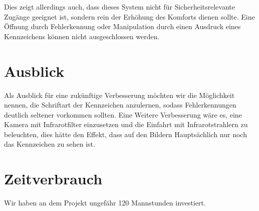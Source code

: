 \documentclass{../Vorlage/sebDenCls}
\begin{document}
Dies zeigt allerdings auch, dass dieses System nicht für Sicherheitsrelevante Zugänge geeignet ist, sondern rein der Erhöhung des Komforts dienen sollte. Eine Öffnung durch Fehlerkennung oder Manipulation durch einen Ausdruck eines Kennzeichens können nicht ausgeschlossen werden.
\section{Ausblick}
Als Ausblick für eine zukünftige Verbesserung möchten wir die Möglichkeit nennen, die Schriftart der Kennzeichen anzulernen, sodass Fehlerkennungen deutlich seltener vorkommen sollten.
Eine Weitere Verbesserung wäre es, eine Kamera mit Infrarotfilter einzusetzen und die Einfahrt mit Infrarotstrahlern zu beleuchten, dies hätte den Effekt, dass auf den Bildern Hauptsächlich nur noch das Kennzeichen zu sehen ist.

\section{Zeitverbrauch}
Wir haben an dem Projekt ungefähr 120 Mannstunden investiert.
\end{document}
